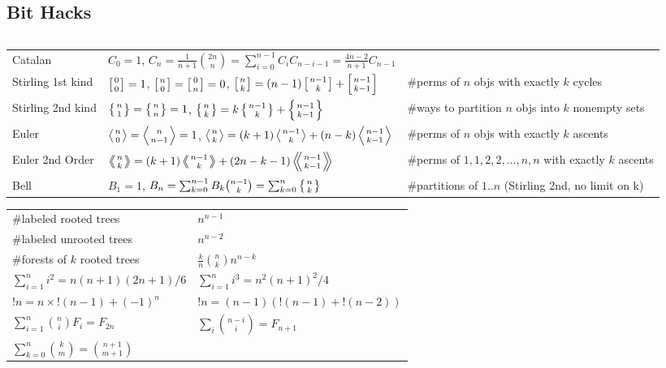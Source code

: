 \documentclass[8pt,a4paper,landscape,oneside]{amsart}
\newcommand{\code}[1]{\inputminted[fontsize=\normalsize,baselinestretch=1]{cpp}{_code/#1}}
\begin{document}
\begin{multicols*}{3}
    \subsection{Bit Hacks}
        \code{tricks/snoob.cpp}
        \newpage
    \begin{tabular}{@{}l|l|l@{}}
    \toprule
    Catalan	&	$C_0=1$, $C_n=\frac{1}{n+1}\binom{2n}{n} = \sum_{i=0}^{n-1}C_iC_{n-i-1} = \frac{4n-2}{n+1}C_{n-1}$  & \\
    Stirling 1st kind & $\left[{0\atop 0}\right]=1$, $\left[{n\atop 0}\right]=\left[{0\atop n}\right]=0$, $\left[{n\atop k}\right]=(n-1)\left[{n-1\atop k}\right]+\left[{n-1\atop k-1}\right]$ & \#perms of $n$ objs with exactly $k$ cycles\\
    Stirling 2nd kind & $\left\{{n\atop 1}\right\}=\left\{{n\atop n}\right\}=1$, $\left\{{n\atop k}\right\} = k \left\{{ n-1 \atop k }\right\} + \left\{{n-1\atop k-1}\right\}$ & \#ways to partition $n$ objs into $k$ nonempty sets\\
    Euler	& $\left \langle {n\atop 0} \right \rangle = \left \langle {n\atop n-1} \right \rangle = 1 $, $\left \langle {n\atop k} \right \rangle = (k+1) \left \langle {n-1\atop {k}} \right \rangle + (n-k)\left \langle {{n-1}\atop {k-1}} \right \rangle$ & \#perms of $n$ objs with exactly $k$ ascents \\
    Euler 2nd Order &  $\left \langle \!\!\left \langle {n\atop k} \right \rangle \!\! \right \rangle = (k+1) \left \langle \!\! \left \langle {{n-1}\atop {k}} \right \rangle \!\! \right \rangle +(2n-k-1)\left \langle \!\! \left \langle {{n-1}\atop {k-1}} \right \rangle  \!\! \right \rangle$ & \#perms of ${1,1,2,2,...,n,n}$ with exactly $k$ ascents \\
    Bell & $B_1 = 1$, $B_n = \sum_{k=0}^{n-1} B_k \binom{n-1}{k} = \sum_{k=0}^n\left\{{n\atop k}\right\}$ & \#partitions of $1..n$ (Stirling 2nd, no limit on k)\\
    \bottomrule
    \end{tabular}

    \vspace{10pt}
    \begin{tabular}{ll}
        \#labeled rooted trees & $n^{n-1}$ \\
        \#labeled unrooted trees & $n^{n-2}$ \\
        \#forests of $k$ rooted trees & $\frac{k}{n}\binom{n}{k}n^{n-k}$ \\
        $\sum_{i=1}^n i^2 = n(n+1)(2n+1)/6$ & $\sum_{i=1}^n i^3 = n^2(n+1)^2/4$ \\
        $!n = n\times!(n-1)+(-1)^n$ & $!n = (n-1)(!(n-1)+!(n-2))$ \\
        $\sum_{i=1}^n \binom{n}{i} F_i = F_{2n}$ & $\sum_{i} \binom{n-i}{i} = F_{n+1}$ \\
        $\sum_{k=0}^n \binom{k}{m} = \binom{n+1}{m+1}$ & \\


\end{tabular}
\end{multicols*}
\end{document}
